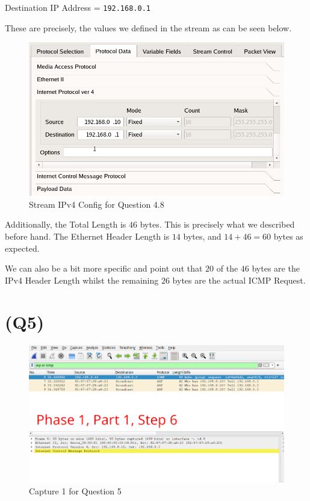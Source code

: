 Destination IP Address = \texttt{192.168.0.1}

These are precisely, the values we defined in the stream as can be seen
below.

\begin{figure}
\centering
\includegraphics{data/q4.8-stream-config.png}
\caption{Stream IPv4 Config for Question 4.8}
\end{figure}

Additionally, the Total Length is \(46\) bytes. This is precisely what
we described before hand. The Ethernet Header Length is \(14\) bytes,
and \(14 + 46 = 60\) bytes as expected.

We can also be a bit more specific and point out that \(20\) of the
\(46\) bytes are the IPv4 Header Length whilst the remaining \(26\)
bytes are the actual ICMP Request.

\hypertarget{q5}{%
\section{(Q5)}\label{q5}}

\begin{figure}
\centering
\includegraphics{data/q5-capture1.png}
\caption{Capture 1 for Question 5}
\end{figure}

